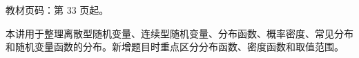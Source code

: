 
\begin{knowledgeBox}
教材页码：第 33 页起。

本讲用于整理离散型随机变量、连续型随机变量、分布函数、概率密度、常见分布和随机变量函数的分布。新增题目时重点区分分布函数、密度函数和取值范围。
\end{knowledgeBox}
